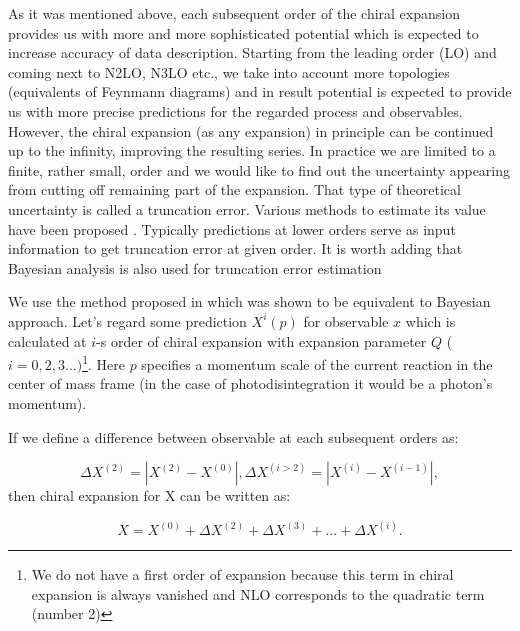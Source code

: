     As it was mentioned above, each subsequent order of the chiral
    expansion provides us with more and more sophisticated
    potential which is expected to increase accuracy of data description.
    Starting from the leading order (LO) and coming next to
    N2LO, N3LO etc., we take into account more topologies (equivalents of Feynmann diagrams) 
    and in result potential is expected to provide us with more precise predictions
    for the regarded process and observables. However, the chiral expansion (as any expansion) 
    in principle can be continued up to the infinity, improving the resulting series.
    In practice we are limited to a finite, rather small, order 
    and we would like to find out
    the uncertainty appearing from cutting off remaining part of the expansion.
    That type of theoretical uncertainty is called a truncation error. 
    Various methods to estimate its value
    have been proposed \cite{epelkrebs2015, Epelbaum2015_trunc, Binder2015, Epelbaum_pos, Miller_arxiv}.
    Typically predictions at lower orders serve as input information to get truncation error at given order.
    It is worth adding that Bayesian analysis is also used for truncation error estimation

    We use the method proposed in \cite{Binder2015} which was shown to be equivalent to Bayesian approach.
    Let's regard some prediction $X^i(p)$ for observable $x$ which is calculated at $i$-s order of chiral expansion 
    with expansion parameter $Q$ ($i = 0,2,3...)$\footnote{We do not have a first order of expansion
    because this term in chiral expansion is always vanished
    and NLO  corresponds to the quadratic term (number 2)}.
    Here $p$ specifies a momentum
    scale of the current reaction in the center of mass frame (in the case of photodisintegration it would be a
    photon's momentum).  

    If we define a difference between observable at each subsequent orders as:

    \begin{equation}
        \Delta X^{(2)} = |X^{(2)} - X^{(0)}|, \Delta X^{(i>2)} = |X^{(i)} - X^{(i-1)}|,
    \end{equation}
    then chiral expansion for X can be written as:

    \begin{equation}
        X = X^{(0)} + \Delta X^{(2)} + \Delta X^{(3)} + ... + \Delta X^{(i)}.
        \label{trunc1}
    \end{equation}
        
